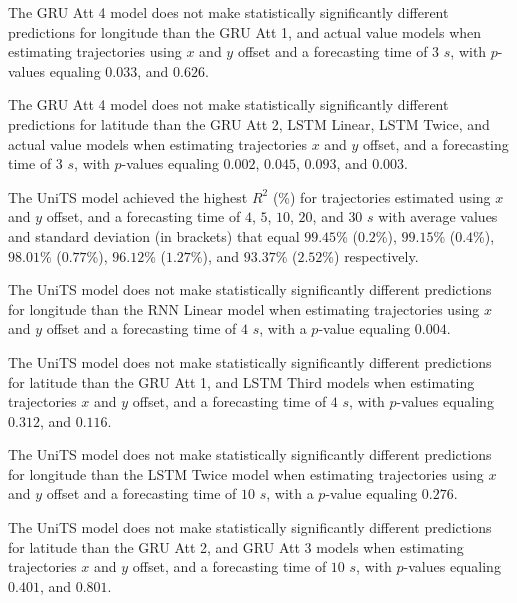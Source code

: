 
The GRU Att 4 model does not make statistically significantly different predictions for longitude than the GRU Att 1, and actual value models when estimating trajectories using $x$ and $y$ offset and a forecasting time of $3$ $s$, with $p$-values equaling $0.033$, and $0.626$.


The GRU Att 4 model does not make statistically significantly different predictions for latitude than the GRU Att 2, LSTM Linear, LSTM Twice, and actual value models when estimating trajectories $x$ and $y$ offset, and a forecasting time of $3$ $s$, with $p$-values equaling $0.002$, $0.045$, $0.093$, and $0.003$.


The UniTS model achieved the highest $R^{2}$ (\%) for trajectories estimated using $x$ and $y$ offset, and a forecasting time of $4$, $5$, $10$, $20$, and $30$ $s$ with average values and standard deviation (in brackets) that equal $99.45$\% ($0.2$\%), $99.15$\% ($0.4$\%), $98.01$\% ($0.77$\%), $96.12$\% ($1.27$\%), and $93.37$\% ($2.52$\%) respectively.

The UniTS model does not make statistically significantly different predictions for longitude than the RNN Linear model when estimating trajectories using $x$ and $y$ offset and a forecasting time of $4$ $s$, with a $p$-value equaling $0.004$.


The UniTS model does not make statistically significantly different predictions for latitude than the GRU Att 1, and LSTM Third models when estimating trajectories $x$ and $y$ offset, and a forecasting time of $4$ $s$, with $p$-values equaling $0.312$, and $0.116$.


The UniTS model does not make statistically significantly different predictions for longitude than the LSTM Twice model when estimating trajectories using $x$ and $y$ offset and a forecasting time of $10$ $s$, with a $p$-value equaling $0.276$.


The UniTS model does not make statistically significantly different predictions for latitude than the GRU Att 2, and GRU Att 3 models when estimating trajectories $x$ and $y$ offset, and a forecasting time of $10$ $s$, with $p$-values equaling $0.401$, and $0.801$.

